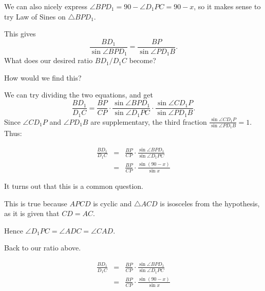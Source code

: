 
We can also nicely express $\angle BPD_1 = 90 - \angle D_1PC = 90-x$, so it makes sense to try Law of Sines on $\triangle BPD_1$.

This gives $$\frac{BD_1}{\sin\angle BPD_1} = \frac{BP}{\sin\angle PD_1B}. $$ What does our desired ratio $BD_1/D_1C$ become?

How would we find this?


We can try dividing the two equations, and get $$\frac{BD_1}{D_1C} = \frac{BP}{CP}\cdot \frac{\sin \angle BPD_1}{\sin\angle D_1PC} \cdot \frac{\sin\angle CD_1P}{\sin\angle PD_1B}. $$ Since $\angle CD_1P$ and $\angle PD_1B$ are supplementary, the third fraction $\frac{\sin\angle CD_1P}{\sin\angle PD_1B} = 1$. Thus:

\begin{eqnarray*}\frac{BD_1}{D_1C} &=& \frac{BP}{CP}\cdot \frac{\sin \angle BPD_1}{\sin\angle D_1PC} \\&=& \frac{BP}{CP}\cdot \frac{\sin (90-x)}{\sin x} \end{eqnarray*}



It turns out that this is a common question.

This is true because $APCD$ is cyclic and $\triangle ACD$ is isosceles from the hypothesis, as it is given that $CD=AC$.

Hence $\angle D_1PC=\angle ADC=\angle CAD$.

Back to our ratio above.

\begin{eqnarray*}\frac{BD_1}{D_1C} &=& \frac{BP}{CP}\cdot \frac{\sin \angle BPD_1}{\sin\angle D_1PC} \\&=& \frac{BP}{CP}\cdot \frac{\sin (90-x)}{\sin x} \end{eqnarray*}

